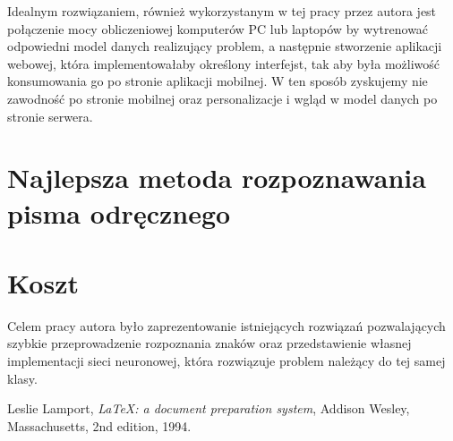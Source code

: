\documentclass[brudnopis]{xmgr}
\begin{document}
Idealnym rozwiązaniem, również wykorzystanym w tej pracy przez autora jest połączenie mocy obliczeniowej komputerów PC lub laptopów by wytrenować odpowiedni model danych realizujący problem, a następnie stworzenie aplikacji webowej, która implementowałaby określony interfejst, tak aby była możliwość konsumowania go po stronie aplikacji mobilnej. W ten sposób zyskujemy nie zawodność po stronie mobilnej oraz personalizacje i wgląd w model danych po stronie serwera.

\section{Najlepsza metoda rozpoznawania pisma odręcznego}



\section{Koszt}

\summary

Celem pracy autora było zaprezentowanie istniejących rozwiązań pozwalających szybkie przeprowadzenie rozpoznania znaków oraz przedstawienie własnej implementacji sieci neuronowej, która rozwiązuje problem należący do tej samej klasy. 




\begin{thebibliography}{9}

  Leslie Lamport,
  \emph{\LaTeX: a document preparation system},
  Addison Wesley, Massachusetts,
  2nd edition,
  1994.

\end{thebibliography}

\oswiadczenie
\end{document}
